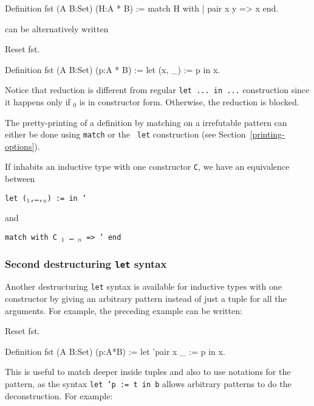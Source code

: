 \begin{coq_example}
Definition fst (A B:Set) (H:A * B) := match H with
                                      | pair x y => x
                                      end.
\end{coq_example}

can be alternatively written 

\begin{coq_eval}
Reset fst.
\end{coq_eval}
\begin{coq_example}
Definition fst (A B:Set) (p:A * B) := let (x, _) := p in x.
\end{coq_example}
Notice that reduction is different from regular {\tt let ... in ...}
construction since it happens only if {\term$_0$} is in constructor
form. Otherwise, the reduction is blocked.

The pretty-printing of a definition by matching on a
irrefutable pattern can either be done using {\tt match} or the {\tt
let} construction (see Section~\ref{printing-options}).

If {\term} inhabits an inductive type with one constructor {\tt C},
we have an equivalence between

{\tt let ({\ident}$_1$,\ldots,{\ident}$_n$) \zeroone{\ifitem} := {\term} in {\term}'}

\noindent and

{\tt match {\term} \zeroone{\ifitem} with C {\ident}$_1$ {\ldots} {\ident}$_n$ \verb!=>! {\term}' end}


\subsubsection{Second destructuring {\tt let} syntax}

Another destructuring {\tt let} syntax is available for inductive types with
one constructor by giving an arbitrary pattern instead of just a tuple
for all the arguments. For example, the preceding example can be written:
\begin{coq_eval}
Reset fst.
\end{coq_eval}
\begin{coq_example}
Definition fst (A B:Set) (p:A*B) := let 'pair x _ := p in x.
\end{coq_example}

This is useful to match deeper inside tuples and also to use notations
for the pattern, as the syntax {\tt let 'p := t in b} allows arbitrary
patterns to do the deconstruction. For example:

